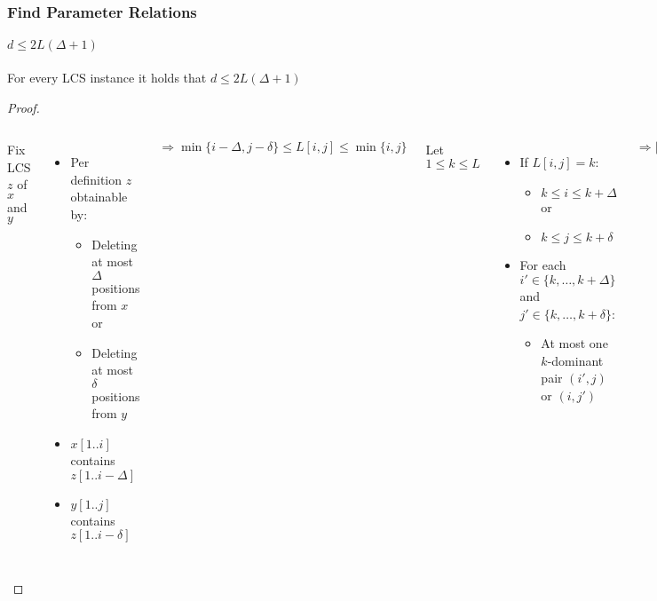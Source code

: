 \begin{frame}
	\frametitle{Find Parameter Relations}
	\framesubtitle{$d \leq 2L(\Delta + 1)$}
	
	\begin{theorem}
	For every LCS instance it holds that $d \leq 2L(\Delta + 1)$
	\end{theorem}
	
	\begin{proof}%
	\color{black}%
	\vspace{1ex}%
	\begin{columns}[onlytextwidth]
	Fix LCS $z$ of $x$ and $y$
	\begin{itemize}
		\color{black}
		\item Per definition $z$ obtainable by:
		\begin{itemize}
			\color{black}
			\item Deleting at most $\Delta$ positions from $x$ or
			\item Deleting at most $\delta$ positions from $y$
		\end{itemize}
		\item $x[1..i]$ contains $z[1..i-\Delta]$
		\item $y[1..j]$ contains $z[1..i-\delta]$
	\end{itemize}
	
	\vspace{2ex}
	$\Rightarrow \min\{i-\Delta, j-\delta\} \leq L[i,j] \leq \min\{i,j\}$
	
	Let $1 \leq k \leq L$
	
	\begin{itemize}
	\color{black}
		\item If $L[i,j] = k$:
		\begin{itemize}
			\color{black}
			\item $k \leq i \leq k + \Delta$ or
			\item $k \leq j \leq k + \delta$
		\end{itemize}
		\item For each $i' \in \{k, \ldots, k + \Delta\}$ and $j' \in \{k, \ldots, k + \delta\}$:
		\begin{itemize}
			\color{black}
			\item At most one $k$-dominant pair $(i',j)$ or $(i,j')$
		\end{itemize}
	\end{itemize}
	
	$\Rightarrow |D_k| \leq \Delta + \delta + 2 \leq 2(\Delta + 1)$
	
	$\Rightarrow d \leq 2L(\Delta + 1)$
	
	\end{columns}
	\end{proof}
\end{frame}